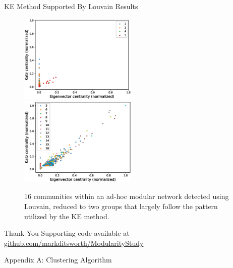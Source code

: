 \documentclass[aspectratio=169,11pt]{beamer}
\begin{document}
\begin{frame}{KE Method Supported By Louvain Results}
	\begin{figure}
			\includegraphics[width=0.5\textwidth]{louvain1.eps}%
			\includegraphics[width=0.5\textwidth]{louvain2.eps}
		\caption{16 communities within an ad-hoc modular network detected using Louvain, reduced to two groups that largely follow the pattern utilized by the KE method.}
		\label{fig:louv}
	\end{figure}
\end{frame}

\begin{frame}{Thank You}
	\centering
	Supporting code available at \href{https://github.com/markditsworth/modularity_study}{github.com/markditsworth/ModularityStudy}
\end{frame}

\begin{frame}{Appendix A: Clustering Algorithm}
	\begin{figure}
		\centering
		\label{fig:clustering}
	\end{figure}
\end{frame}
\end{document}
